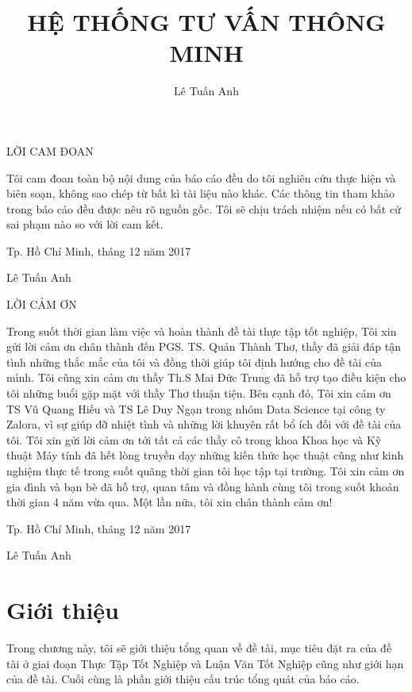 \documentclass[a4paper,12pt,numbered,print,index,custombib, oneside, custommargin]{report}
\title{HỆ THỐNG TƯ VẤN THÔNG MINH}
\author{Lê Tuấn Anh}
\newcommand\tab[1][1cm]{\hspace*{#1}}
\begin{document}
\maketitle
\begin{center}
\Huge{LỜI CAM ĐOAN}
\end{center}
Tôi cam đoan toàn bộ nội dung của báo cáo đều do tôi nghiên cứu thực hiện và biên soạn, không sao chép từ bất kì tài liệu nào khác. Các thông tin tham khảo trong báo cáo đều được nêu rõ nguồn gốc. Tôi sẽ chịu trách nhiệm nếu có bất cứ sai phạm nào so với lời cam kết.


\tab \tab Tp. Hồ Chí Minh, tháng 12 năm 2017 \par
\tab \tab \tab \tab Lê Tuấn Anh
\pagebreak

\begin{center}
\Huge{LỜI CẢM ƠN}
\end{center}
Trong suốt thời gian làm việc và hoàn thành đề tài thực tập tốt nghiệp, Tôi xin gửi lời cảm ơn chân thành đến PGS. TS. Quản Thành Thơ, thầy đã giải đáp tận tình những thắc mắc của tôi và đồng thời giúp tôi định hướng cho đề tài của mình. Tôi cũng xin cảm ơn thầy Th.S Mai Đức Trung đã hỗ trợ tạo điều kiện cho tôi những buổi gặp mặt với thầy Thơ thuận tiện. Bên cạnh đó, Tôi xin cám ơn TS Vũ Quang Hiếu và TS Lê Duy Ngạn trong nhóm Data Science tại công ty Zalora, vì sự giúp đỡ nhiệt tình và những lời khuyên rất bổ ích đối với đề tài của tôi.
Tôi xin gửi lời cảm ơn tới tất cả các thầy cô trong khoa Khoa học và Kỹ thuật Máy tính đã hết lòng truyền dạy những kiến thức học thuật cũng như kinh nghiệm thực tế trong suốt quãng thời gian tôi học tập tại trường.
Tôi xin cảm ơn gia đình và bạn bè đã hỗ trợ, quan tâm và đồng hành cùng tôi trong suốt khoản thời gian 4 năm vừa qua.
Một lần nữa, tôi xin chân thành cảm ơn!


\tab \tab Tp. Hồ Chí Minh, tháng 12 năm 2017 \par
\tab \tab \tab \tab Lê Tuấn Anh
\pagebreak

\tableofcontents

\listoffigures

\listoftables


\chapter{Giới thiệu}

Trong chương này, tôi sẽ giới thiệu tổng quan về đề tài, mục tiêu đặt ra của đề tài ở giai đoạn Thực Tập Tốt Nghiệp và Luận Văn Tốt Nghiệp cũng như giới hạn của đề tài. Cuối cùng là phần giới thiệu cấu trúc tổng quát của báo cáo.
\end{document}
